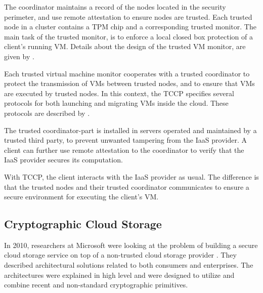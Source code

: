 \documentclass[pdftex,english,10pt,b5paper,twoside]{book}
\begin{document}
The coordinator maintains a record of the nodes located in the security
perimeter, and use remote attestation to ensure nodes are trusted. Each trusted
node in a cluster contains a \ac{TPM} chip and a corresponding trusted monitor.
The main task of the trusted monitor, is to enforce a local closed box
protection of a client's running \ac{VM}. Details about the design of the
trusted \ac{VM} monitor, are given by \citet{tvmm}. 

Each trusted virtual machine monitor cooperates with a trusted coordinator to
protect the transmission of \acp{VM} between trusted nodes, and to ensure that
\acp{VM} are executed by trusted nodes. In this context, the \ac{TCCP}
specifies several protocols for both launching and migrating \acp{VM} inside
the cloud. These protocols are described by \citet{tccp}.

The trusted coordinator-part is installed in servers operated and maintained by a
trusted third party, to prevent unwanted tampering from the \ac{IaaS} provider.
A client can further use remote attestation to the coordinator to verify that the
\ac{IaaS} provider secures its computation.

With \ac{TCCP}, the client interacts with the \ac{IaaS} provider as usual. The
difference is that the trusted nodes and their trusted coordinator communicates
to ensure a secure environment for executing the client's \ac{VM}.

\subsection{Cryptographic Cloud Storage}

In 2010, researchers at Microsoft were looking at the problem of building a secure
cloud storage service on top of a non-trusted cloud storage provider
\cite{microsoftresearch}. They described architectural solutions related to both consumers and
enterprises. The architectures were explained in high level and were designed to
utilize and combine recent and non-standard cryptographic primitives.
\end{document}
